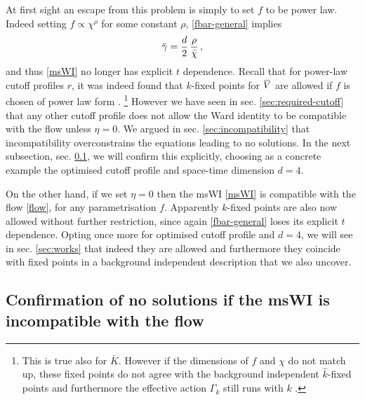 \documentclass[11pt]{book} %
\newcommand{\overbar}[1]{\mkern 1.5mu\overline{\mkern-1.5mu#1\mkern-1.5mu}\mkern 1.5mu}
\newcommand{\bV}{\overbar V}
\newcommand{\bg}{\overbar \gamma}
\newcommand{\bc}{\bar \chi}
\numberwithin{equation}{chapter}
\begin{document}
At first sight an escape from this problem is simply to set $f$ to be power law.
Indeed setting $f\propto\chi^{\rho}$ for some constant $\rho$, \eqref{fbar-general} implies
\begin{align}
  \bg = \frac{d}{2} \, \frac{\rho}{\bc}\,,
  \label{powlaw-gamma}
\end{align}
and thus \eqref{msWI} no longer has explicit $t$ dependence.
Recall that for power-law cutoff profiles $r$, it was indeed found that $k$-fixed points for $\bV$
are allowed if $f$ is chosen of power law form \cite{Dietz:2015owa}.%
\footnote{This is true also for $\bar{K}$. However if the dimensions of $f$ and $\chi$ do not match up,
  these fixed points do not agree with the background independent $\hat{k}$-fixed points and furthermore
the effective action $\Gamma_k$ still runs with $k$ \cite{Dietz:2015owa}.}
However we have seen in sec. \ref{sec:required-cutoff} that any other cutoff profile does
not allow the Ward identity to be compatible with the flow unless $\eta=0$.
We argued in sec. \ref{sec:incompatibility} that incompatibility overconstrains the equations
leading to no solutions. In the next subsection, sec. \ref{sec:incompatible-no-solns},
we will confirm this explicitly, choosing as a concrete example the optimised cutoff profile and
space-time dimension $d=4$.

On the other hand, if we set $\eta=0$ then the msWI \eqref{msWI} is compatible with the flow \eqref{flow},
for any parametrisation $f$. Apparently $k$-fixed points are also now allowed without further restriction,
since again \eqref{fbar-general} loses its explicit $t$ dependence.
Opting once more for optimised cutoff profile and $d=4$, we will see in sec. \ref{sec:works} that
indeed they are allowed and furthermore they coincide with fixed points in a background independent
description that we also uncover.


\subsection{Confirmation of no solutions if the msWI is incompatible with the flow}
\label{sec:incompatible-no-solns}
\end{document}
